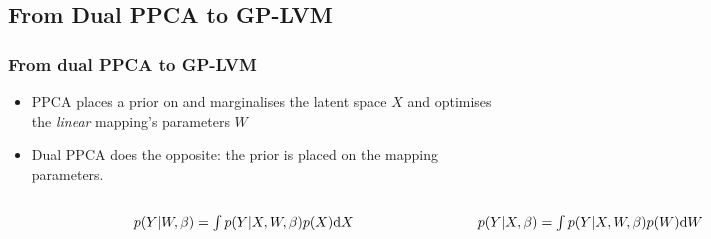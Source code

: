 \documentclass{beamer}
\begin{document}
\subsection{From Dual PPCA to GP-LVM}
\begin{frame}
\frametitle{From dual PPCA to GP-LVM}
\begin{itemize}
    \item \alert{PPCA} places a prior on and marginalises the latent space $X$ and optimises the \emph{linear} mapping's parameters $W$
    \item \alert{Dual PPCA} does the opposite: the prior is placed on the mapping parameters.
  \begin{columns}
        \begin{figure}
	\begin{center}
	      \includegraphics[width=0.4\textwidth]{ppcaSimple2.png}
	\end{center}
	\end{figure}
	\centering
	$p(Y|W,\beta)=\int p(Y|X,W,\beta)p(X) \text{d} X$
    
    
	\begin{figure}
	\begin{center}
	     \includegraphics[width=0.4\textwidth]{gplvmSimple2.png}
	\end{center}
	\end{figure}
	\centering
	$p(Y|X,\beta)=\int p(Y|X,W,\beta)p(W) \text{d} W$
  

   \end{columns}
\end{itemize}
\end{frame}
\end{document}
